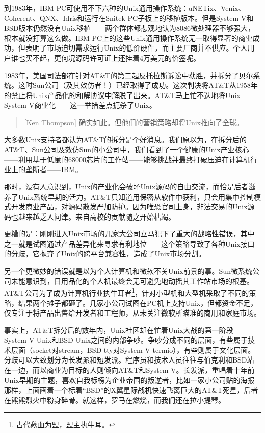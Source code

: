 \documentclass[12pt,oneside]{book}
\begin{document}
到1983年，IBM PC可使用不下六种的Unix通用操作系统：uNETix、Venix、Coherent、QNX、Idris和运行在Snitek PC子板上的移植版本。但是System V和BSD版本仍然没有Unix移植——两个群体都悲观地认为8086微处理器不够强大，根本就没打算这么做。IBM PC上的这些Unix通用操作系统无一取得显著的商业成功，但表明了市场迫切需求运行Unix的低价硬件，而主要厂商并不供应。个人用户谁也买不起，更何况源码许可证上还挂着4万美元的价签呢。

1983年，美国司法部在针对AT\&{}T的第二起反托拉斯诉讼中获胜，并拆分了贝尔系统。这时Sun公司（及其效仿者！）已经取得了成功。这次判决将AT\&{}T从1958年的禁止将Unix产品化的和解协议中解脱了出来。AT\&{}T马上忙不迭地将Unix System V商业化——这一举措差点扼杀了Unix。

\begin{quote}[Ken Thompson]
确实如此。但他们的营销策略却将Unix推向了全球。
\end{quote}

大多数Unix支持者都认为AT\&{}T的拆分是个好消息。我们原以为，在拆分后的AT\&{}T、Sun公司及效仿Sun的小公司中，我们看到了一个健康的Unix产业核心——利用基于低廉的68000芯片的工作站——能够挑战并最终打破压迫在计算机行业上的垄断者——IBM。

那时，没有人意识到，Unix的产业化会破坏Unix源码的自由交流，而恰是后者滋养了Unix系统早期的活力。AT\&{}T只知道用保密从软件中获利，只会用集中控制模式开发商业产品，对源码散发严加防护。因为唯恐官司上身，非法交易的Unix源码也越来越乏人问津。来自高校的贡献随之开始枯竭。

更糟的是：刚刚进入Unix市场的几家大公司立马犯下了重大的战略性错误，其中之一就是试图通过产品差异化来寻求有利地位——这个策略导致了各种Unix接口的分歧，它抛弃了Unix的跨平台兼容性，造成了Unix市场分割。

另一个更微妙的错误就是以为个人计算机和微软不关Unix前景的事。Sun微系统公司未能意识到，日用品化的个人机最终会无可避免地动摇其工作站市场的根基。AT\&{}T公司为了成为计算机行业执牛耳者\footnote{古代歃血为盟，盟主执牛耳。}，针对小型机和大型机采取了不同的策略，结果两个摊子都砸了。几家小公司试图在PC机上支持Unix，但都资金不足，仅专注于将产品出售给开发者和工程师，从未关注微软所瞄准的商用和家庭市场。

事实上，AT\&{}T拆分后的数年内，Unix社区却在忙着Unix大战的第一阶段——System V Unix和BSD Unix之间的内部争吵。争吵分成不同的层面，有些属于技术层面（socket对stream，BSD tty对System V termio），有些则属于文化层面。分歧可以大致划分为长发派和短发派。程序员和技术人员往往与伯克利和BSD站在一边，而以商业为目标的人则倾向AT\&{}T和System V。长发派，重唱着十年前Unix早期的主题，喜欢自我标榜为企业帝国的叛逆者，比如一家小公司贴的海报那样，上面画着一个标着“BSD”的X翼星际战机快速飞离巨大的AT\&{}T死星，后者在熊熊烈火中粉身碎骨。就这样，罗马在燃烧，而我们还在拉小提琴。
\end{document}
